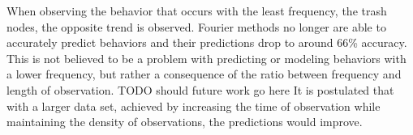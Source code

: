 \begin{table}[h!]
  \centering
  \caption{Hallway Meal Section 1}
\end{table}


When observing the behavior that occurs with the least frequency, the trash
nodes, the opposite trend is observed. Fourier methods no longer are able to
accurately predict behaviors and their predictions drop to around 66\% accuracy.
This is not believed to be a problem with predicting or modeling behaviors with a
lower frequency, but rather a consequence of the ratio between frequency and
length of observation. TODO should future work go here\? It is postulated that
with a larger data set, achieved by increasing the time of observation while
maintaining the density of observations, the predictions would improve. \\

